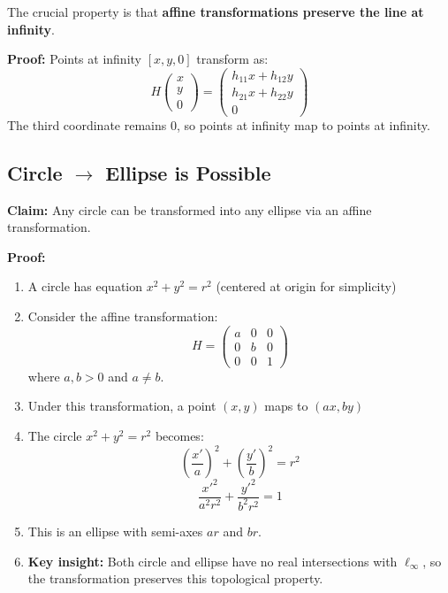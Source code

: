 \documentclass[12pt]{article}
\begin{document}
The crucial property is that \textbf{affine transformations preserve the line at infinity}. 

\textbf{Proof:} Points at infinity $[x, y, 0]$ transform as:
\[
H \begin{pmatrix} x \\ y \\ 0 \end{pmatrix} = \begin{pmatrix} h_{11}x + h_{12}y \\ h_{21}x + h_{22}y \\ 0 \end{pmatrix}
\]
The third coordinate remains 0, so points at infinity map to points at infinity.

\subsection*{Circle $\rightarrow$ Ellipse is Possible}

\textbf{Claim:} Any circle can be transformed into any ellipse via an affine transformation.

\textbf{Proof:}
\begin{enumerate}
    \item A circle has equation $x^2 + y^2 = r^2$ (centered at origin for simplicity)
    \item Consider the affine transformation:
    \[
    H = \begin{pmatrix}
    a & 0 & 0 \\
    0 & b & 0 \\
    0 & 0 & 1
    \end{pmatrix}
    \]
    where $a, b > 0$ and $a \neq b$.
    
    \item Under this transformation, a point $(x, y)$ maps to $(ax, by)$
    \item The circle $x^2 + y^2 = r^2$ becomes:
    \[
    \left(\frac{x'}{a}\right)^2 + \left(\frac{y'}{b}\right)^2 = r^2
    \]
    \[
    \frac{x'^2}{a^2r^2} + \frac{y'^2}{b^2r^2} = 1
    \]
    
    \item This is an ellipse with semi-axes $ar$ and $br$.
    
    \item \textbf{Key insight:} Both circle and ellipse have no real intersections with $\ell_\infty$, so the transformation preserves this topological property.
\end{enumerate}
\end{document}
